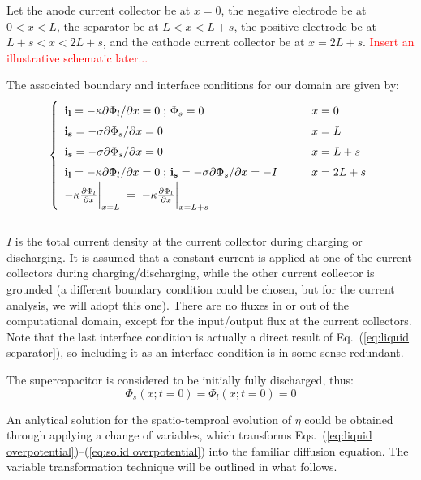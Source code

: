 Let the anode current collector be at $x = 0$, the negative electrode be at $0 < x < L$, the separator be at $L < x < L+s$, the positive electrode be at $L+s < x <  2L+s$, and the cathode current collector be at $ x = 2L+s$.
\textcolor{red}{Insert an illustrative schematic later...}

The associated boundary and interface conditions for our domain are given by:
\begin{equation}
\left\{
\renewcommand{\arraystretch}{1.5}
\begin{array}{lcl}
\bold{i_l} = -\kappa  \partial \Phi_l / \partial x = 0 \; ; \, \Phi_s = 0 &\quad&  x = 0\\
\bold{i_s} = -\sigma  \partial \Phi_s / \partial x = 0  &\quad&  x = L\\
\bold{i_s} = -\sigma  \partial \Phi_s / \partial x = 0  &\quad&  x = L+s\\
\bold{i_l} = -\kappa  \partial \Phi_l / \partial x = 0 \; ; \, \bold{i_s} = -\sigma  \partial \Phi_s / \partial x = -I &\quad&  x = 2L+s \\
-\kappa \frac{\partial \Phi_l}{\partial x}\bigg|_{x = L}\;  =\;-\kappa \frac{\partial \Phi_l}{\partial x}\bigg|_{x = L+s}\end{array}\right. 
\label{eq:BCs}
\end{equation}
\\
$I$ is the total current density at the current collector during charging or discharging. It is assumed that a constant current is applied at one of the current collectors during charging/discharging, while the other current collector is grounded (a different boundary condition could be chosen, but for the current analysis, we will adopt this one). There are no fluxes in or out of the computational domain, except for the input/output flux at the current collectors. Note that the last interface condition is actually a direct result of Eq.~(\ref{eq:liquid separator}), so including it as an interface condition is in some sense redundant.

The supercapacitor is considered to be initially fully discharged, thus:
\begin{equation}
\Phi_s(x; t = 0) = \Phi_l(x; t = 0) = 0
\label{eq:ICs}
\end{equation}

An anlytical solution for the spatio-temproal evolution of $\eta$ could be obtained through applying a change of variables, which transforms Eqs.~(\ref{eq:liquid overpotential})--(\ref{eq:solid overpotential}) into the familiar diffusion equation. The variable transformation technique will be outlined in what follows.

